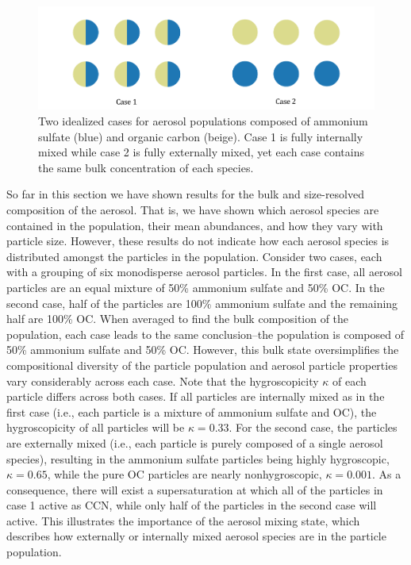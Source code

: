 \begin{figure}[!t]
  \centering
    \includegraphics[width=\textwidth]{figures/chapter5/mixing-state-ideal-cases.pdf}
    \caption{Two idealized cases for aerosol populations composed of ammonium sulfate (blue) and organic carbon (beige). Case 1 is fully internally mixed while case 2 is fully externally mixed, yet each case contains the same bulk concentration of each species.}
    \label{fig:mixing-state-scenarios}
\end{figure}

So far in this section we have shown results for the bulk and size-resolved composition of the aerosol. That is, we have shown which aerosol species are contained in the population, their mean abundances, and how they vary with particle size. However, these results do not indicate how each aerosol species is distributed amongst the particles in the population. Consider two cases, each with a grouping of six monodisperse aerosol particles. In the first case, all aerosol particles are an equal mixture of 50\% ammonium sulfate and 50\% OC. In the second case, half of the particles are 100\% ammonium sulfate and the remaining half are 100\% OC. When averaged to find the bulk composition of the population, each case leads to the same conclusion--the population is composed of 50\% ammonium sulfate and 50\% OC. However, this bulk state oversimplifies the compositional diversity of the particle population and aerosol particle properties vary considerably across each case. Note that the hygroscopicity $\kappa$ of each particle differs across both cases. If all particles are internally mixed as in the first case (i.e., each particle is a mixture of ammonium sulfate and OC), the hygroscopicity of all particles will be $\kappa=0.33$. For the second case, the particles are externally mixed (i.e., each particle is purely composed of a single aerosol species), resulting in the ammonium sulfate particles being highly hygroscopic, $\kappa=0.65$, while the pure OC particles are nearly nonhygroscopic, $\kappa=0.001$. As a consequence, there will exist a supersaturation at which all of the particles in case 1 active as CCN, while only half of the particles in the second case will active. This illustrates the importance of the aerosol mixing state, which describes how externally or internally mixed aerosol species are in the particle population. 

